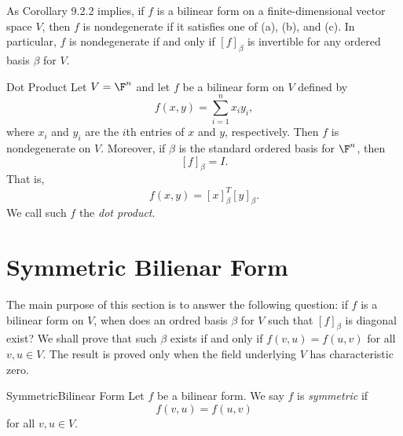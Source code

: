 \documentclass[linearalgebra]{subfiles}
\begin{document}
    \begin{remark}
        As Corollary 9.2.2 implies, if $f$ is a bilinear form on a finite-dimensional vector space $V$, then $f$ is nondegenerate if it satisfies one of (a), (b), and (c). In particular, $f$ is nondegenerate if and only if $\left[ f \right] _\beta$ is invertible for any ordered basis $\beta$ for $V$.
    \end{remark}

    \begin{definition}{Dot Product}{}
        Let $V = \F^n$ and let $f$ be a bilinear form on $V$ defined by
        \begin{equation*}
            f\left( x,y \right) = \sum^{n}_{i=1} x_iy_i,
        \end{equation*}
        where $x_i$ and $y_i$ are the $i$th entries of $x$ and $y$, respectively. Then $f$ is nondegenerate on $V$. Moreover, if $\beta$ is the standard ordered basis for $\F^n$, then
        \begin{equation*}
            \left[ f \right] _\beta = I.
        \end{equation*}
        That is,
        \begin{equation*}
            f\left( x,y \right) = \left[ x \right] _\beta^T \left[ y \right] _\beta.
        \end{equation*}
        We call such $f$ the \emph{dot product}.
    \end{definition}

    \section{Symmetric Bilienar Form}
    
    \begin{remark}
        The main purpose of this section is to answer the following question: if $f$ is a bilinear form on $V$, when does an ordred basis $\beta$ for $V$ such that $[f]_\beta$ is diagonal exist? We shall prove that such $\beta$ exists if and only if $f\left( v,u \right) = f\left( u,v \right)$ for all $v,u\in V$.  The result is proved only when the field underlying $V$ has characteristic zero.
    \end{remark}

    \begin{definition}{Symmetric}{Bilinear Form}
        Let $f$ be a bilinear form. We say $f$ is \emph{symmetric} if
        \begin{equation*}
            f\left( v,u \right) = f\left( u,v \right) 
        \end{equation*}
        for all $v,u\in V$.
    \end{definition}
\end{document}
